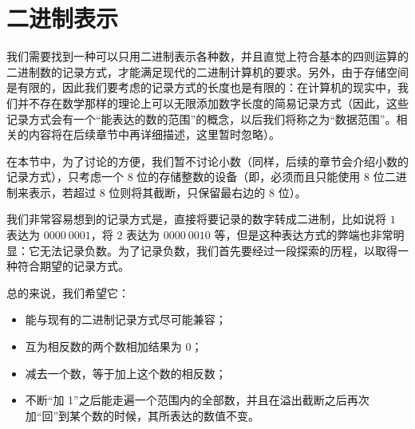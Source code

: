 \section{二进制表示}\label{sec:NumberSystemBasics/BinaryPresentation}
    我们需要找到一种可以只用二进制表示各种数，并且直觉上符合基本的四则运算的二进制数的记录方式，才能满足现代的二进制计算机的要求。另外，由于存储空间是有限的，因此我们要考虑的记录方式的长度也是有限的：在计算机的现实中，我们并不存在数学那样的理论上可以无限添加数字长度的简易记录方式（因此，这些记录方式会有一个“能表达的数的范围”的概念，以后我们将称之为“数据范围”。相关的内容将在后续章节中再详细描述，这里暂时忽略）。

    在本节中，为了讨论的方便，我们暂不讨论小数（同样，后续的章节会介绍小数的记录方式），只考虑一个 $8$ 位的存储整数的设备（即，必须而且只能使用 $8$ 位二进制来表示，若超过 $8$ 位则将其截断，只保留最右边的 $8$ 位）。

    我们非常容易想到的记录方式是，直接将要记录的数字转成二进制，比如说将 $1$ 表达为 $0000\ 0001$，将 $2$ 表达为 $0000\ 0010$ 等，但是这种表达方式的弊端也非常明显：它无法记录负数。为了记录负数，我们首先要经过一段探索的历程，以取得一种符合期望的记录方式。

    总的来说，我们希望它：
    \begin{itemize}
        \item 能与现有的二进制记录方式尽可能兼容；
        \item 互为相反数的两个数相加结果为 $0$；
        \item 减去一个数，等于加上这个数的相反数；
        \item 不断“加 1”之后能走遍一个范围内的全部数，并且在溢出截断之后再次加“回”到某个数的时候，其所表达的数值不变。
    \end{itemize}

%
%
